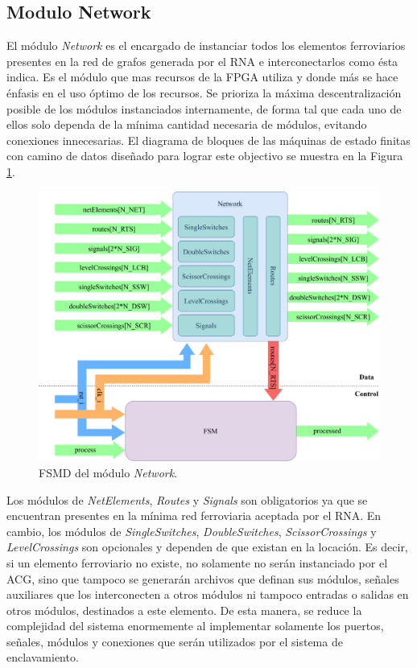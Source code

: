 \subsection{Modulo Network}

El módulo \textit{Network} es el encargado de instanciar todos los elementos ferroviarios presentes en la red de grafos generada por el RNA e interconectarlos como ésta indica. Es el módulo que mas recursos de la FPGA utiliza y donde más se hace énfasis en el uso óptimo de los recursos. Se prioriza la máxima descentralización posible de los módulos instanciados internamente, de forma tal que cada uno de ellos solo dependa de la mínima cantidad necesaria de módulos, evitando conexiones innecesarias. El diagrama de bloques de las máquinas de estado finitas con camino de datos diseñado para lograr este objectivo se muestra en la Figura \ref{fig:Network_module}.

\begin{figure}[H]
	\centering
	\includegraphics[width=1\textwidth]{Figuras/Network_module.png}
	\centering\caption{FSMD del módulo \textit{Network}.}
	\label{fig:Network_module}
\end{figure}

Los módulos de \textit{NetElements}, \textit{Routes} y \textit{Signals} son obligatorios ya que se encuentran presentes en la mínima red ferroviaria aceptada por el RNA. En cambio, los módulos de \textit{SingleSwitches}, \textit{DoubleSwitches}, \textit{ScissorCrossings} y \textit{LevelCrossings} son opcionales y dependen de que existan en la locación. Es decir, si un elemento ferroviario no existe, no solamente no serán instanciado por el ACG, sino que tampoco se generarán archivos que definan sus módulos, señales auxiliares que los interconecten a otros módulos ni tampoco entradas o salidas en otros módulos, destinados a este elemento. De esta manera, se reduce la complejidad del sistema enormemente al implementar solamente los puertos, señales, módulos y conexiones que serán utilizados por el sistema de enclavamiento.

